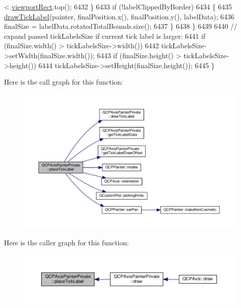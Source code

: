 \begin{DoxyCode}
       < \hyperlink{class_q_c_p_axis_painter_private_a8627dc6b40781e3291bb508e4ac574d6}{viewportRect}.top();
6432     \}
6433     \textcolor{keywordflow}{if} (!labelClippedByBorder)
6434     \{
6435       \hyperlink{class_q_c_p_axis_painter_private_ad8f2f12cd35b8189e8bf96679e873933}{drawTickLabel}(painter, finalPosition.x(), finalPosition.y(), labelData);
6436       finalSize = labelData.rotatedTotalBounds.size();
6437     \}
6438   \}
6439   
6440   \textcolor{comment}{// expand passed tickLabelsSize if current tick label is larger:}
6441   \textcolor{keywordflow}{if} (finalSize.width() > tickLabelsSize->width())
6442     tickLabelsSize->setWidth(finalSize.width());
6443   \textcolor{keywordflow}{if} (finalSize.height() > tickLabelsSize->height())
6444     tickLabelsSize->setHeight(finalSize.height());
6445 \}
\end{DoxyCode}


Here is the call graph for this function\+:\nopagebreak
\begin{figure}[H]
\begin{center}
\leavevmode
\includegraphics[width=350pt]{class_q_c_p_axis_painter_private_af8fe7350c19575bc33ca770f9b3a15fd_cgraph}
\end{center}
\end{figure}




Here is the caller graph for this function\+:\nopagebreak
\begin{figure}[H]
\begin{center}
\leavevmode
\includegraphics[width=350pt]{class_q_c_p_axis_painter_private_af8fe7350c19575bc33ca770f9b3a15fd_icgraph}
\end{center}
\end{figure}


